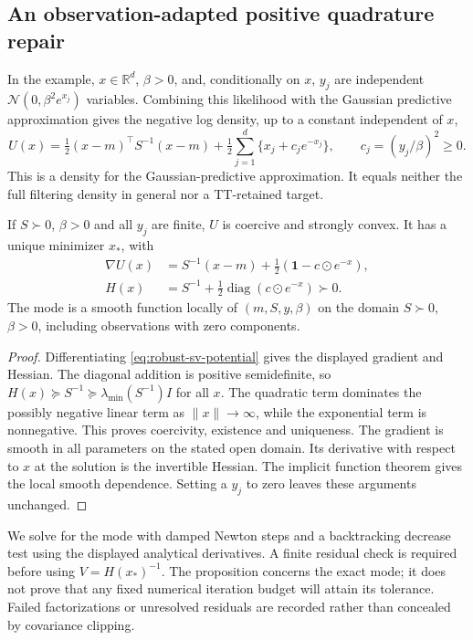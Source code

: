 \subsection{An observation-adapted positive quadrature repair}

In the example, $x\in\mathbb R^d$, $\beta>0$, and, conditionally on $x$,
$y_j$ are independent $\mathcal N(0,\beta^2 e^{x_j})$ variables. Combining
this likelihood with the Gaussian predictive approximation gives the
negative log density, up to a constant independent of $x$,
\begin{equation}
 U(x)=\tfrac12(x-m)^\top S^{-1}(x-m)
       +\tfrac12\sum_{j=1}^d\{x_j+c_j e^{-x_j}\},
 \qquad c_j=(y_j/\beta)^2\ge0 .
 \label{eq:robust-sv-potential}
\end{equation}
This is a density for the Gaussian-predictive approximation. It equals
neither the full filtering density in general nor a TT-retained target.

\begin{proposition}
\label{prop:robust-mode}
If $S\succ0$, $\beta>0$ and all $y_j$ are finite, $U$ is coercive and
strongly convex. It has a unique minimizer $x_*$, with
\begin{align}
 \nabla U(x)&=S^{-1}(x-m)+\tfrac12(\boldsymbol1-c\odot e^{-x}),
 \nonumber\\
 H(x)&=S^{-1}+\tfrac12\operatorname{diag}(c\odot e^{-x})\succ0 .
 \label{eq:robust-mode-derivatives}
\end{align}
The mode is a smooth function locally of $(m,S,y,\beta)$ on the domain
$S\succ0$, $\beta>0$, including observations with zero components.
\end{proposition}
\begin{proof}
Differentiating \eqref{eq:robust-sv-potential} gives the displayed gradient
and Hessian. The diagonal addition is positive semidefinite, so
$H(x)\succeq S^{-1}\succeq\lambda_{\min}(S^{-1})I$ for all $x$.
The quadratic term dominates the possibly negative linear term as
$\|x\|\to\infty$, while the exponential term is nonnegative. This
proves coercivity, existence and uniqueness. The gradient is smooth in all
parameters on the stated open domain. Its derivative with respect to $x$
at the solution is the invertible Hessian. The implicit function theorem
gives the local smooth dependence. Setting a $y_j$ to zero leaves these
arguments unchanged.
\end{proof}

We solve for the mode with damped Newton steps and a backtracking decrease
test using the displayed analytical derivatives. A finite residual check
is required before using $V=H(x_*)^{-1}$. The proposition concerns the
exact mode; it does not prove that any fixed numerical iteration budget
will attain its tolerance. Failed factorizations or unresolved residuals
are recorded rather than concealed by covariance clipping.

